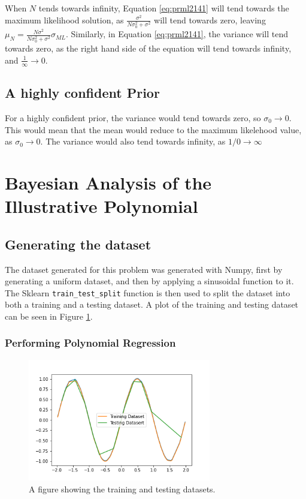 \documentclass[a4paper, 11pt]{article}
\begin{document}
When $N$ tends towards infinity, Equation \ref{eq:prml2141} will tend towards the maximum likelihood solution, as $\frac{\sigma^2}{N\sigma_0^2 + \sigma^2}$ will tend towards zero, leaving $\mu_N = \frac{N\sigma^2}{N\sigma_0^2 + \sigma^2}\sigma_{ML}$. 
Similarly, in Equation \ref{eq:prml2141}, the variance will tend towards zero, as the right hand side of the equation will tend towards infinity, and $\frac{1}{\infty} \rightarrow 0$.

\subsection{A highly confident Prior}

For a highly confident prior, the variance would tend towards zero, so $\sigma_0 \rightarrow 0$. This would mean that the mean would reduce to the maximum likelehood value, as $\sigma_0 \rightarrow 0$. The variance would also tend towards infinity, as $1/0 \rightarrow \infty$

\section{Bayesian Analysis of the Illustrative Polynomial}

\subsection{Generating the dataset}
The dataset generated for this problem was generated with Numpy, first by generating a uniform dataset, and then by applying a sinusoidal function to it. The Sklearn \verb|train_test_split| function is then used to split the dataset into both a training and a testing dataset. A plot of the training and testing dataset can be seen in Figure \ref{fig:traintestsplit}.

\subsubsection{Performing Polynomial Regression}

\begin{figure}[h]
    \begin{center}
    \includegraphics[width=8cm]{fig/traintestsplit.png}
    \caption{A figure showing the training and testing datasets.}
    \label{fig:traintestsplit}
\end{center}
\end{figure}
\end{document}
